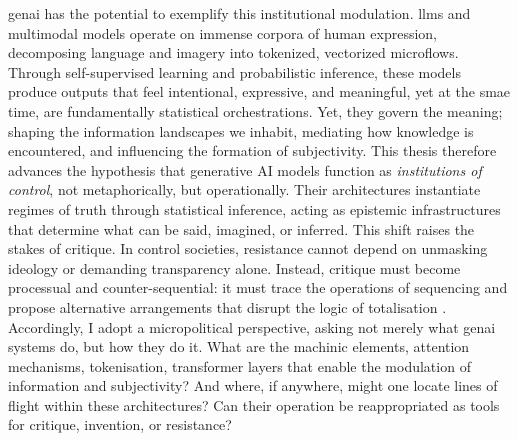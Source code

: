 
\Gls{genai}  has the potential to exemplify this institutional modulation. \Glspl{llm}  and multimodal models operate on immense corpora of human expression, decomposing language and imagery into tokenized, vectorized microflows. Through self-supervised learning and probabilistic inference, these models produce outputs that feel intentional, expressive, and meaningful, yet at the smae time, are fundamentally statistical orchestrations. Yet, they govern the meaning; shaping the information landscapes we inhabit, mediating how knowledge is encountered, and influencing the formation of subjectivity.
This thesis therefore advances the hypothesis that generative AI models function as \emph{institutions of control}, not metaphorically, but operationally. Their architectures instantiate regimes of truth through statistical inference, acting as epistemic infrastructures that determine what can be said, imagined, or inferred. This shift raises the stakes of critique. In control societies, resistance cannot depend on unmasking ideology or demanding transparency alone. Instead, critique must become processual and counter-sequential: it must trace the operations of sequencing and propose alternative arrangements that disrupt the logic of totalisation \parencite{mackenzie2021} . Accordingly, I adopt a micropolitical perspective, asking not merely what \gls{genai} systems do, but how they do it. What are the machinic elements, attention mechanisms, tokenisation, transformer layers that enable the modulation of information and subjectivity? And where, if anywhere, might one locate lines of flight within these architectures? Can their operation be reappropriated as tools for critique, invention, or resistance?

